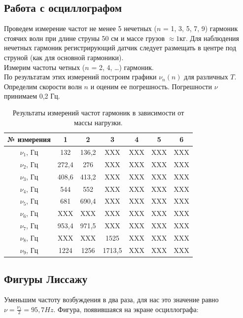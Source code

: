 \documentclass[13pt,a4paper]{article}
\begin{document}
\subsection{Работа с осциллографом}
Проведем измерение частот не менее 5 нечетных ($n$ = 1, 3, 5, 7, 9) гармоник стоячих волн при длине струны 50 см и массе грузов $\approx1$кг. Для наблюдения нечетных гармоник регистрирующий датчик следует размещать в центре под струной (как для основной гармоники).\\


Измерим частоты четных ($n$ = 2, 4, …) гармоник.\\

По результатам этих измерений построим графики $\nu_{n}(n)$ для различных $T$. Определим скорости волн $n$ и оценим ее погрешность. Погрешности $\nu$ принимаем 0,2 Гц.

\begin{table}[h!]
\centering
\begin{tabular}{|c|c|c|c|c|c|c|}
\hline
№ измерения & 1        & 2        & 3        & 4        & 5        & 6        \\ \hline
$\nu_{1}$, Гц      & 132    & 136,2    & XXX    & XXX    & XXX    & XXX    \\ \hline
$\nu_{2}$, Гц      & 272,4    & 276    & XXX   & XXX      & XXX    & XXX    \\ \hline
$\nu_{3}$, Гц      & 408,6    & 413,2    & XXX    & XXX      & XXX    & XXX    \\ \hline
$\nu_{4}$, Гц      & 544    & 552    & XXX    & XXX    & XXX      & XXX    \\ \hline
$\nu_{5}$, Гц      & 681      & 690,4    & XXX    & XXX     & XXX     & XXX     \\ \hline
$\nu_{6}$, Гц      & XXX    & XXX     & XXX     & XXX   & XXX   & XXX   \\ \hline
$\nu_{7}$, Гц      & 953,4    & 971,5     & XXX   & XXX   & XXX   & XXX   \\ \hline
$\nu_{8}$, Гц      & XXX     & XXX  & 1525  & XXX & XXX & XXX \\ \hline
$\nu_{9}$, Гц      & 1224   & 1256 & 1713,5 & XXX & XXX & XXX \\ \hline
\end{tabular}
\caption{Результаты измерений частот гармоник в зависимости от массы нагрузки.}
\label{tab:measuring_results}
\end{table}
\newpage

\subsection{Фигуры Лиссажу}
Уменьшим частоту возбуждения в два раза, для нас это значение равно $\nu=\frac{\nu_{1}}{2}=95,7 Hz$. Фигура, появившаяся на экране осциллографа:
\end{document}
